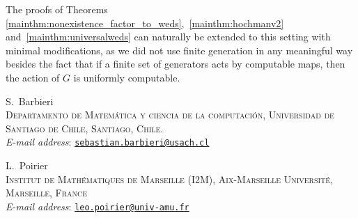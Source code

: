 \documentclass{article}
\makeatletter
\theoremstyle{definition}
\theoremstyle{plain}
\newcommand{\Addresses}{{
    \footnotesize
    \begin{samepage}
        \noindent S.~Barbieri\\
        \textsc{Departamento de Matem\'{a}tica y ciencia de la computaci\'{o}n, Universidad de Santiago de Chile, Santiago, Chile.}\\
        \indent\emph{E-mail address}: \texttt{\href{mailto:sebastian.barbieri@usach.cl}{sebastian.barbieri@usach.cl}}
    \end{samepage}
		
	\medskip

    \begin{samepage}
        \noindent L.~Poirier\\
        \textsc{Institut de Math\'ematiques de Marseille (I2M), Aix-Marseille Université, Marseille, France}\\
        \indent\emph{E-mail address}: \texttt{\href{mailto:leo.poirier@univ-amu.fr}{leo.poirier@univ-amu.fr}}
    \end{samepage}
}}
\makeatother
\begin{document}
The proofs of Theorems \ref{mainthm:nonexistence_factor_to_weds},~\ref{mainthm:hochmanv2} and~\ref{mainthm:universalweds} can naturally be extended to this setting with minimal modifications, as we did not use finite generation in any meaningful way besides the fact that if a finite set of generators acts by computable maps, then the action of $G$ is uniformly computable.




\bigskip
\Addresses
\end{document}
